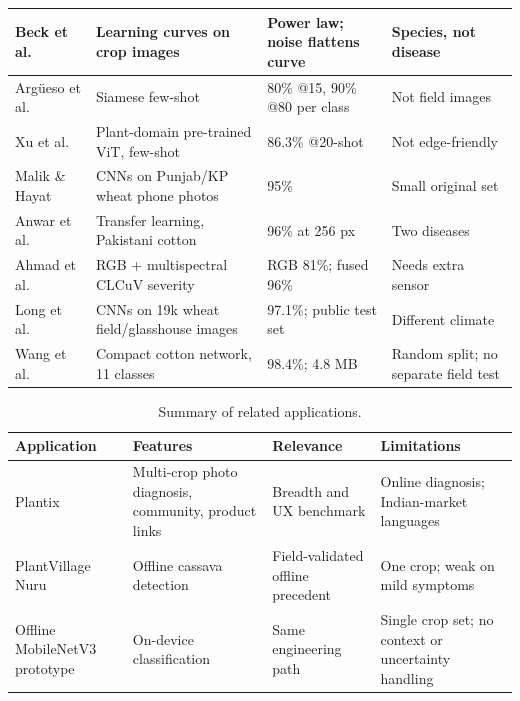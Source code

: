\begin{longtable}{|L{2.6cm}|L{4.0cm}|L{4.2cm}|L{3.4cm}|}
Beck et al.~\cite{beck2022curves} & Learning curves on crop images & Power law; noise flattens curve & Species, not disease \\ \hline
Argüeso et al.~\cite{argueso2020fewshot} & Siamese few-shot & 80\% @15, 90\% @80 per class & Not field images \\ \hline
Xu et al.~\cite{xu2022transfer} & Plant-domain pre-trained ViT, few-shot & 86.3\% @20-shot & Not edge-friendly \\ \hline
Malik \& Hayat~\cite{malik2025wheatpk} & CNNs on Punjab/KP wheat phone photos & 95\% & Small original set \\ \hline
Anwar et al.~\cite{anwarcotton2023pk} & Transfer learning, Pakistani cotton & 96\% at 256 px & Two diseases \\ \hline
Ahmad et al.~\cite{ahmad2024clcuvfusion} & RGB + multispectral CLCuV severity & RGB 81\%; fused 96\% & Needs extra sensor \\ \hline
Long et al.~\cite{long2024ukwheat} & CNNs on 19k wheat field/glasshouse images & 97.1\%; public test set & Different climate \\ \hline
Wang et al.~\cite{wang2025cotton} & Compact cotton network, 11 classes & 98.4\%; 4.8 MB & Random split; no separate field test \\ \hline
\end{longtable}
\normalsize

\begin{table}[H]
\centering\small
\caption{Summary of related applications.}
\label{tab:appsummary}
\begin{tabularx}{\textwidth}{|L{2.6cm}|Y|Y|Y|}
\hline
\textbf{Application} & \textbf{Features} & \textbf{Relevance} & \textbf{Limitations} \\ \hline
Plantix~\cite{plantix} & Multi-crop photo diagnosis, community, product links & Breadth and UX benchmark & Online diagnosis; Indian-market languages \\ \hline
PlantVillage Nuru~\cite{mrisho2020nuru} & Offline cassava detection & Field-validated offline precedent & One crop; weak on mild symptoms \\ \hline
Offline MobileNetV3 prototype~\cite{offlinemnv3app2026} & On-device classification & Same engineering path & Single crop set; no context or uncertainty handling \\ \hline
\end{tabularx}
\end{table}

